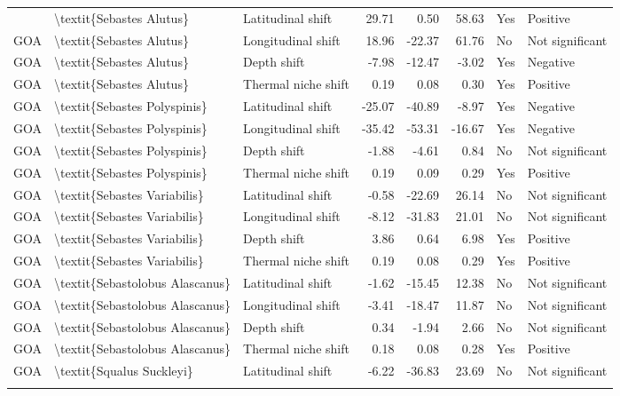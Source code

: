 \begin{longtable}[t]{lllrrrll}
{{GOA & \textbackslash{}textit\{Sebastes Alutus\} & Latitudinal shift & 29.71 & 0.50 & 58.63 & Yes & Positive\\
GOA & \textbackslash{}textit\{Sebastes Alutus\} & Longitudinal shift & 18.96 & -22.37 & 61.76 & No & Not significant\\
\addlinespace
GOA & \textbackslash{}textit\{Sebastes Alutus\} & Depth shift & -7.98 & -12.47 & -3.02 & Yes & Negative\\
GOA & \textbackslash{}textit\{Sebastes Alutus\} & Thermal niche shift & 0.19 & 0.08 & 0.30 & Yes & Positive\\
GOA & \textbackslash{}textit\{Sebastes Polyspinis\} & Latitudinal shift & -25.07 & -40.89 & -8.97 & Yes & Negative\\
GOA & \textbackslash{}textit\{Sebastes Polyspinis\} & Longitudinal shift & -35.42 & -53.31 & -16.67 & Yes & Negative\\
GOA & \textbackslash{}textit\{Sebastes Polyspinis\} & Depth shift & -1.88 & -4.61 & 0.84 & No & Not significant\\
\addlinespace
GOA & \textbackslash{}textit\{Sebastes Polyspinis\} & Thermal niche shift & 0.19 & 0.09 & 0.29 & Yes & Positive\\
GOA & \textbackslash{}textit\{Sebastes Variabilis\} & Latitudinal shift & -0.58 & -22.69 & 26.14 & No & Not significant\\
GOA & \textbackslash{}textit\{Sebastes Variabilis\} & Longitudinal shift & -8.12 & -31.83 & 21.01 & No & Not significant\\
GOA & \textbackslash{}textit\{Sebastes Variabilis\} & Depth shift & 3.86 & 0.64 & 6.98 & Yes & Positive\\
GOA & \textbackslash{}textit\{Sebastes Variabilis\} & Thermal niche shift & 0.19 & 0.08 & 0.29 & Yes & Positive\\
\addlinespace
GOA & \textbackslash{}textit\{Sebastolobus Alascanus\} & Latitudinal shift & -1.62 & -15.45 & 12.38 & No & Not significant\\
GOA & \textbackslash{}textit\{Sebastolobus Alascanus\} & Longitudinal shift & -3.41 & -18.47 & 11.87 & No & Not significant\\
GOA & \textbackslash{}textit\{Sebastolobus Alascanus\} & Depth shift & 0.34 & -1.94 & 2.66 & No & Not significant\\
GOA & \textbackslash{}textit\{Sebastolobus Alascanus\} & Thermal niche shift & 0.18 & 0.08 & 0.28 & Yes & Positive\\
GOA & \textbackslash{}textit\{Squalus Suckleyi\} & Latitudinal shift & -6.22 & -36.83 & 23.69 & No & Not significant\\
}}
\end{longtable}

